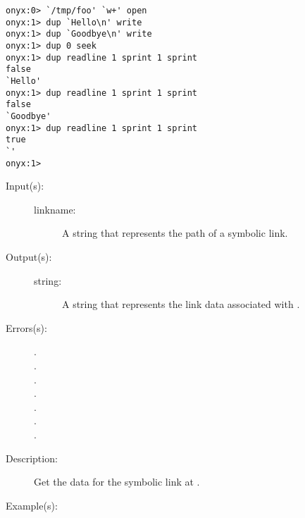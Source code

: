 \begin{description}
\begin{description}
\begin{verbatim}
onyx:0> `/tmp/foo' `w+' open
onyx:1> dup `Hello\n' write
onyx:1> dup `Goodbye\n' write
onyx:1> dup 0 seek
onyx:1> dup readline 1 sprint 1 sprint
false
`Hello'
onyx:1> dup readline 1 sprint 1 sprint
false
`Goodbye'
onyx:1> dup readline 1 sprint 1 sprint
true
`'
onyx:1>
		\end{verbatim}
	\end{description}
\label{systemdict:readlink}
\item[{\onyxop{linkname}{readlink}{string}}: ]
	\begin{description}\item[]
	\item[Input(s): ]
		\begin{description}\item[]
		\item[linkname: ]
			A string that represents the path of a symbolic link.
		\end{description}
	\item[Output(s): ]
		\begin{description}\item[]
		\item[string: ]
			A string that represents the link data associated with
			.
		\end{description}
	\item[Errors(s): ]
		\begin{description}\item[]
		\item[.]
		\item[.]
		\item[.]
		\item[.]
		\item[.]
		\item[.]
		\item[.]
		\end{description}
	\item[Description: ]
		Get the data for the symbolic link at .
	\item[Example(s): ]\begin{verbatim}


\end{verbatim}
\end{description}
\end{description}
